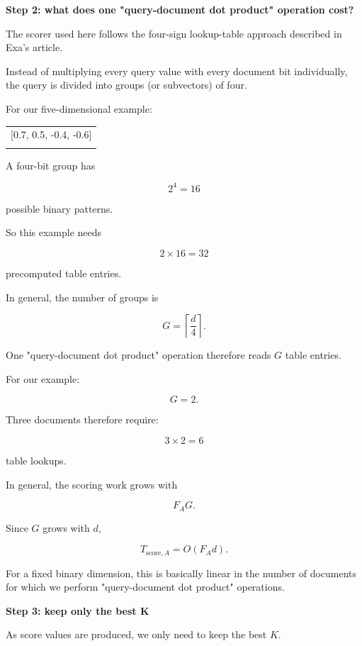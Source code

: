 \textbf{Step 2: what does one "query-document dot product" operation cost?}\par

The scorer used here follows the four-sign lookup-table approach described in Exa’s article.

Instead of multiplying every query value with every document bit individually, the query is divided into groups (or subvectors) of four.

For our five-dimensional example:

\begin{center}\begingroup\small\ttfamily\begin{tabular}{l}
[0.7, 0.5, -0.4, -0.6]\\ \relax [0.3, 0, 0, 0]
\end{tabular}\endgroup\end{center}

A four-bit group has

\[
2^4=16
\]

possible binary patterns.

So this example needs

\[
2\times16=32
\]

precomputed table entries.

In general, the number of groups is

\[
G=\left\lceil\frac d4\right\rceil.
\]

One "query-document dot product" operation therefore reads \(G\) table entries.

For our example:

\[
G=2.
\]

Three documents therefore require:

\[
3\times2=6
\]

table lookups.

In general, the scoring work grows with

\[
F_AG.
\]

Since \(G\) grows with \(d\),

\[
T_{\text{score},A}=O(F_Ad).
\]

For a fixed binary dimension, this is basically linear in the number of documents for which we perform "query-document dot product" operations.



\textbf{Step 3: keep only the best K}\par

As score values are produced, we only need to keep the best \(K\).

